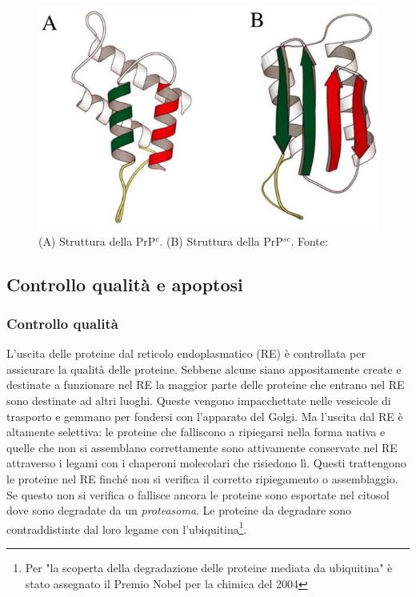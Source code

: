 {{\begin{figure}[h]
	\centering
	\includegraphics{images/PrPc.jpg}
	\caption{(A) Struttura della PrP$^{c}$. (B) Struttura della PrP$^{sc}$. Fonte: \cite{ruttkay2015prion}}
	\label{fig:PrPc}
\end{figure} 

}
\subsection{Controllo qualità e apoptosi}
{
\subsubsection{Controllo qualità}
L'uscita delle proteine dal reticolo endoplasmatico (RE) è controllata per assicurare la qualità delle proteine. Sebbene alcune siano appositamente create e destinate a funzionare nel RE la maggior parte delle proteine che entrano nel RE sono destinate ad altri luoghi. Queste vengono impacchettate nelle vescicole di trasporto e gemmano per fondersi con l'apparato del Golgi. Ma l'uscita dal RE è altamente selettiva: le proteine che falliscono a ripiegarsi nella forma nativa e quelle che non si assemblano correttamente sono attivamente conservate nel RE attraverso i legami con i chaperoni molecolari che risiedono lì. Questi trattengono le proteine nel RE finché non si verifica il corretto ripiegamento o assemblaggio. Se questo non si verifica o fallisce ancora le proteine sono esportate nel citosol dove sono degradate da un \textit{proteasoma}. Le proteine da degradare sono contraddistinte dal loro legame con l'ubiquitina\footnote{Per "la scoperta della degradazione delle proteine mediata da ubiquitina" è stato assegnato il Premio Nobel per la chimica del 2004}.

}}
